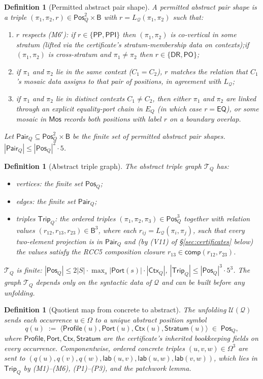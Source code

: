 \documentclass[11pt]{article}
\newtheorem{definition}[theorem]{Definition}
\newcommand{\Base}{\mathsf{B}}
\newcommand{\EQ}{\mathsf{EQ}}
\newcommand{\DR}{\mathsf{DR}}
\newcommand{\PO}{\mathsf{PO}}
\newcommand{\PP}{\mathsf{PP}}
\newcommand{\PPI}{\mathsf{PPI}}
\newcommand{\comp}{\mathsf{comp}}
\newcommand{\Q}{\mathcal Q}
\newcommand{\U}{\mathcal U}
\newcommand{\Mos}{\mathsf{Mos}}
\newcommand{\Ctx}{\mathsf{Ctx}}
\newcommand{\Port}{\mathsf{Port}}
\newcommand{\lab}{\mathsf{lab}}
\newcommand{\Pos}{\mathsf{Pos}}
\newcommand{\Pair}{\mathsf{Pair}}
\newcommand{\Trip}{\mathsf{Trip}}
\newcommand{\Profile}{\mathsf{Profile}}
\newcommand{\Stratum}{\mathsf{Stratum}}
\begin{document}
\begin{definition}[Permitted abstract pair shape]\label{def:abs-pair}
A permitted abstract pair shape is a triple
$(\pi_1,\pi_2,r)\in\Pos_Q^2\times\Base$ with $r=L_\Q(\pi_1,\pi_2)$
such that:
\begin{enumerate}[label=(P\arabic*)]
\item $r$ respects (M6$'$): if $r\in\{\PP,\PPI\}$ then
$(\pi_1,\pi_2)$ is co-vertical in some stratum (lifted via the
certificate's stratum-membership data on contexts);\@ if
$(\pi_1,\pi_2)$ is cross-stratum and $\pi_1\neq\pi_2$ then
$r\in\{\DR,\PO\}$;
\item if $\pi_1$ and $\pi_2$ lie in the same context ($C_1=C_2$),
$r$ matches the relation that $C_1$'s mosaic data assigns to that
pair of positions, in agreement with $L_\Q$;
\item if $\pi_1$ and $\pi_2$ lie in distinct contexts
$C_1\neq C_2$, then either $\pi_1$ and $\pi_2$ are linked through
an explicit equality-port chain in $E_Q$ (in which case $r=\EQ$),
or some mosaic in $\Mos$ records both positions
with label $r$ on a boundary overlap.
\end{enumerate}
Let $\Pair_Q\subseteq\Pos_Q^2\times\Base$ be the finite set of
permitted abstract pair shapes.  $|\Pair_Q|\le|\Pos_Q|^2\cdot 5$.
\end{definition}

\begin{definition}[Abstract triple graph]\label{def:T-Q}
The abstract triple graph $\mathcal T_Q$ has:
\begin{itemize}
\item vertices: the finite set $\Pos_Q$;
\item edges: the finite set $\Pair_Q$;
\item triples $\Trip_Q$: the ordered triples
$(\pi_1,\pi_2,\pi_3)\in\Pos_Q^3$ together with relation values
$(r_{12},r_{13},r_{23})\in\Base^3$, where each $r_{ij}=L_\Q(\pi_i,\pi_j)$,
such that every two-element projection is in $\Pair_Q$ and (by (V11) of
\S\ref{sec:certificates} below) the values satisfy the RCC5
composition closure $r_{13}\in\comp(r_{12},r_{23})$.
\end{itemize}
$\mathcal T_Q$ is finite: $|\Pos_Q|\le 2|S|\cdot
\max_s|\Port(s)|\cdot|\Ctx_Q|$, $|\Trip_Q|\le|\Pos_Q|^3\cdot 5^3$.
The graph $\mathcal T_Q$ depends only on the syntactic data of
$\Q$ and can be built before any unfolding.
\end{definition}

\begin{definition}[Quotient map from concrete to abstract]\label{def:quotient-map}
The unfolding $\U(\Q)$ sends each occurrence $u\in\Omega$ to a
unique abstract position symbol
\[
  q(u)\;:=\;\langle\Profile(u),\Port(u),\Ctx(u),\Stratum(u)\rangle\;\in\;\Pos_Q,
\]
where $\Profile,\Port,\Ctx,\Stratum$ are the certificate's
inherited bookkeeping fields on every occurrence.  Componentwise,
ordered concrete triples $(u,v,w)\in\Omega^3$ are sent to
$(q(u),q(v),q(w),\lab(u,v),\lab(u,w),\lab(v,w))$, which lies in
$\Trip_Q$ by (M1)--(M6), (P1)--(P3), and the patchwork lemma.
\end{definition}
\end{document}
